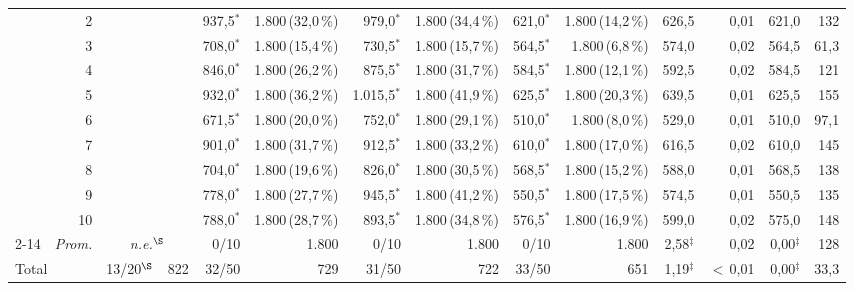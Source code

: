 \documentclass[11pt,a4paper]{article}
\begin{document}
\begin{table}[htbp]
{\begin{tabular}{rr rr rr rr rr rr rr}
 & 2 &  &  & 937{,}5$^{*}$ & 1.800\,{\scriptsize(32{,}0\,\%)} & 979{,}0$^{*}$ & 1.800\,{\scriptsize(34{,}4\,\%)} & 621{,}0$^{*}$ & 1.800\,{\scriptsize(14{,}2\,\%)} & 626{,}5 & 0{,}01 & 621{,}0 & 132 \\
 & 3 &  &  & 708{,}0$^{*}$ & 1.800\,{\scriptsize(15{,}4\,\%)} & 730{,}5$^{*}$ & 1.800\,{\scriptsize(15{,}7\,\%)} & 564{,}5$^{*}$ & 1.800\,{\scriptsize(6{,}8\,\%)} & 574{,}0 & 0{,}02 & 564{,}5 & 61{,}3 \\
 & 4 &  &  & 846{,}0$^{*}$ & 1.800\,{\scriptsize(26{,}2\,\%)} & 875{,}5$^{*}$ & 1.800\,{\scriptsize(31{,}7\,\%)} & 584{,}5$^{*}$ & 1.800\,{\scriptsize(12{,}1\,\%)} & 592{,}5 & 0{,}02 & 584{,}5 & 121 \\
 & 5 &  &  & 932{,}0$^{*}$ & 1.800\,{\scriptsize(36{,}2\,\%)} & 1.015{,}5$^{*}$ & 1.800\,{\scriptsize(41{,}9\,\%)} & 625{,}5$^{*}$ & 1.800\,{\scriptsize(20{,}3\,\%)} & 639{,}5 & 0{,}01 & 625{,}5 & 155 \\
 & 6 &  &  & 671{,}5$^{*}$ & 1.800\,{\scriptsize(20{,}0\,\%)} & 752{,}0$^{*}$ & 1.800\,{\scriptsize(29{,}1\,\%)} & 510{,}0$^{*}$ & 1.800\,{\scriptsize(8{,}0\,\%)} & 529{,}0 & 0{,}01 & 510{,}0 & 97{,}1 \\
 & 7 &  &  & 901{,}0$^{*}$ & 1.800\,{\scriptsize(31{,}7\,\%)} & 912{,}5$^{*}$ & 1.800\,{\scriptsize(33{,}2\,\%)} & 610{,}0$^{*}$ & 1.800\,{\scriptsize(17{,}0\,\%)} & 616{,}5 & 0{,}02 & 610{,}0 & 145 \\
 & 8 &  &  & 704{,}0$^{*}$ & 1.800\,{\scriptsize(19{,}6\,\%)} & 826{,}0$^{*}$ & 1.800\,{\scriptsize(30{,}5\,\%)} & 568{,}5$^{*}$ & 1.800\,{\scriptsize(15{,}2\,\%)} & 588{,}0 & 0{,}01 & 568{,}5 & 138 \\
 & 9 &  &  & 778{,}0$^{*}$ & 1.800\,{\scriptsize(27{,}7\,\%)} & 945{,}5$^{*}$ & 1.800\,{\scriptsize(41{,}2\,\%)} & 550{,}5$^{*}$ & 1.800\,{\scriptsize(17{,}5\,\%)} & 574{,}5 & 0{,}01 & 550{,}5 & 135 \\
 & 10 &  &  & 788{,}0$^{*}$ & 1.800\,{\scriptsize(28{,}7\,\%)} & 893{,}5$^{*}$ & 1.800\,{\scriptsize(34{,}8\,\%)} & 576{,}5$^{*}$ & 1.800\,{\scriptsize(16{,}9\,\%)} & 599{,}0 & 0{,}02 & 575{,}0 & 148 \\
\cmidrule(l){2-14}
 & \emph{Prom.} & \multicolumn{2}{c}{\textit{n.e.}$^{\S}$} & 0/10 & 1.800 & 0/10 & 1.800 & 0/10 & 1.800 & 2{,}58$^{\ddagger}$ & 0{,}02 & 0{,}00$^{\ddagger}$ & 128 \\
\midrule
\multicolumn{2}{l}{Total} & 13/20$^{\S}$ & 822 & 32/50 & 729 & 31/50 & 722 & 33/50 & 651 & 1{,}19$^{\ddagger}$ & $<$\,0{,}01 & 0{,}00$^{\ddagger}$ & 33{,}3 \\
\bottomrule
\end{tabular}%
}
\end{table}
\end{document}
